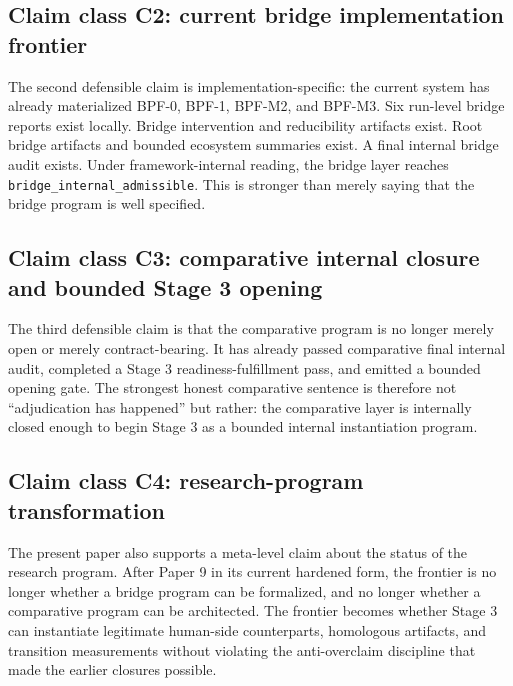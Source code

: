 \documentclass[11pt,a4paper]{article}
\theoremstyle{definition}
\begin{document}
\subsection{Claim class C2: current bridge implementation frontier}
The second defensible claim is implementation-specific: the current system has already materialized BPF-0, BPF-1, BPF-M2, and BPF-M3. Six run-level bridge reports exist locally. Bridge intervention and reducibility artifacts exist. Root bridge artifacts and bounded ecosystem summaries exist. A final internal bridge audit exists. Under framework-internal reading, the bridge layer reaches \texttt{bridge\_internal\_admissible}. This is stronger than merely saying that the bridge program is well specified.

\subsection{Claim class C3: comparative internal closure and bounded Stage 3 opening}
The third defensible claim is that the comparative program is no longer merely open or merely contract-bearing. It has already passed comparative final internal audit, completed a Stage 3 readiness-fulfillment pass, and emitted a bounded opening gate. The strongest honest comparative sentence is therefore not ``adjudication has happened'' but rather: the comparative layer is internally closed enough to begin Stage 3 as a bounded internal instantiation program.

\subsection{Claim class C4: research-program transformation}
The present paper also supports a meta-level claim about the status of the research program. After Paper 9 in its current hardened form, the frontier is no longer whether a bridge program can be formalized, and no longer whether a comparative program can be architected. The frontier becomes whether Stage 3 can instantiate legitimate human-side counterparts, homologous artifacts, and transition measurements without violating the anti-overclaim discipline that made the earlier closures possible.
\end{document}
